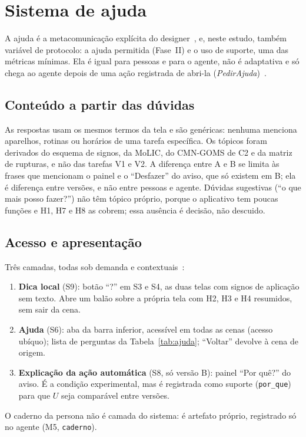\documentclass[conference,onecolumn]{IEEEtran}
\begin{document}
\begin{table}[!h]
\caption{Etiquetas do MAC como padrões de eventos}
\label{tab:mac}
\centering
\scriptsize

\end{table}

\section{Sistema de ajuda}\label{sec:ajuda}

A ajuda é a metacomunicação explícita do designer~\cite{barbosa2010}, \cite{silveira2002} e, neste estudo, também variável de protocolo: a ajuda permitida (Fase~II) e o uso de suporte, uma das métricas mínimas. Ela é igual para pessoas e para o agente, não é adaptativa e só chega ao agente depois de uma ação registrada de abri-la (\textit{PedirAjuda})~\cite{lara2026p3}.

\subsection{Conteúdo a partir das dúvidas}
\begin{table}[!h]
\caption{Tópicos da Ajuda (S6) por tipo de dúvida; texto igual ao exibido}
\label{tab:ajuda}
\centering
\scriptsize

\end{table}

As respostas usam os mesmos termos da tela e são genéricas: nenhuma menciona aparelhos, rotinas ou horários de uma tarefa específica. Os tópicos foram derivados do esquema de signos, da MoLIC, do CMN-GOMS de C2 e da matriz de rupturas, e não das tarefas V1 e V2. A diferença entre A e B se limita às frases que mencionam o painel e o ``Desfazer'' do aviso, que só existem em B; ela é diferença entre versões, e não entre pessoas e agente. Dúvidas sugestivas (``o que mais posso fazer?'') não têm tópico próprio, porque o aplicativo tem poucas funções e H1, H7 e H8 as cobrem; essa ausência é decisão, não descuido.

\subsection{Acesso e apresentação}
Três camadas, todas sob demanda e contextuais~\cite{barbosa2010}:
\begin{enumerate}
\item \textbf{Dica local} (S9): botão ``?'' em S3 e S4, as duas telas com signos de aplicação sem texto. Abre um balão sobre a própria tela com H2, H3 e H4 resumidos, sem sair da cena.
\item \textbf{Ajuda} (S6): aba da barra inferior, acessível em todas as cenas (acesso ubíquo); lista de perguntas da Tabela~\ref{tab:ajuda}; ``Voltar'' devolve à cena de origem.
\item \textbf{Explicação da ação automática} (S8, só versão B): painel ``Por quê?'' do aviso. É a condição experimental, mas é registrada como suporte (\texttt{por\_que}) para que $U$ seja comparável entre versões.
\end{enumerate}
O caderno da persona não é camada do sistema: é artefato próprio, registrado só no agente (M5, \texttt{caderno}).
\end{document}
